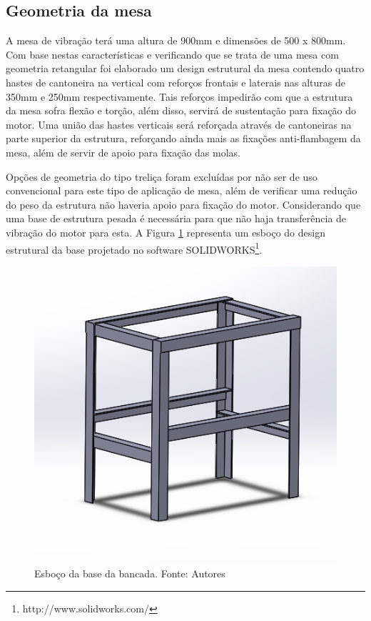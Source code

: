 \subsection*{\textbf{Geometria da mesa}}

	A mesa de vibração terá uma altura de 900mm e dimensões de 500 x 800mm. Com base nestas características e verificando que se trata de uma mesa com geometria retangular foi elaborado um design estrutural da mesa contendo quatro hastes de cantoneira na vertical com reforços frontais e laterais nas alturas de 350mm e 250mm respectivamente. Tais reforços impedirão com que a estrutura da mesa sofra flexão e torção, além disso, servirá de sustentação para fixação do motor. Uma união das hastes verticais será reforçada através de cantoneiras na parte superior da estrutura, reforçando ainda mais as fixações anti-flambagem da mesa, além de servir de apoio para fixação das molas. 
    
    Opções de geometria do tipo treliça foram excluídas por não ser de uso convencional para este tipo de aplicação de mesa, além de verificar uma redução do peso da estrutura não haveria apoio para fixação do motor. Considerando que uma base de estrutura pesada é necessária para que não haja transferência de vibração do motor para esta. A Figura \ref{fig:base_bancada} representa um esboço do design estrutural da base projetado no software SOLIDWORKS\footnote{http://www.solidworks.com/}.

\begin{figure}[!ht]
\centering
\includegraphics[scale=0.5]{figuras/base_bancada.png}
\caption{Esboço da base da bancada. Fonte: Autores}
\label{fig:base_bancada}
\end{figure}

